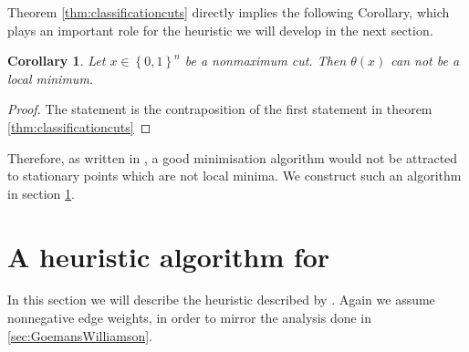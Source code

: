 \documentclass[12pt,a4paper]{article}
\theoremstyle{mythm}
\newtheorem{cor}[thm]{Corollary}
\begin{document}
Theorem \ref{thm:classificationcuts} directly implies the following Corollary, which plays an important role for the heuristic we will develop in the next section.
\begin{cor}
Let $ x \in \left\{ 0,1 \right\} ^{ n } $ be a nonmaximum cut. Then $ \theta ( x )  $ can not be a local minimum.
\end{cor} 
\begin{proof}
The statement is the contraposition of the first statement in theorem \ref{thm:classificationcuts} 
\end{proof}
Therefore, as written in \cite[p.509]{Burer2002}, a good minimisation algorithm would not be attracted to stationary points which are not local minima. 
We construct such an algorithm in section \ref{burerHeuristic}.
\newpage
\section{A heuristic algorithm for \MCP} 
\label{burerHeuristic} 
In this section we will describe the heuristic described by \cite{Burer2002}.
Again we assume nonnegative edge weights, in order to mirror the analysis done in \ref{sec:GoemansWilliamson}.
\end{document}
